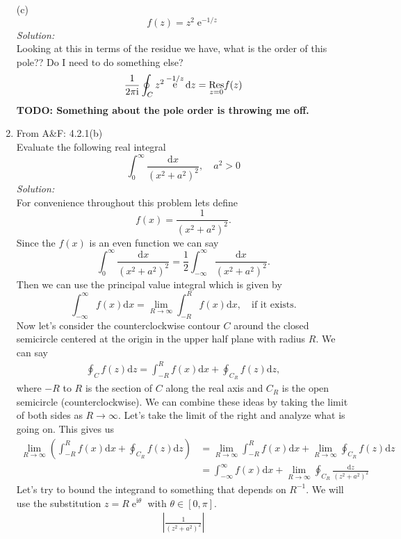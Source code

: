 \documentclass[10pt]{amsart}
\newcommand{\D}{\mathrm{d}}
\newcommand{\I}{\mathrm{i}}
\DeclareMathOperator{\E}{e}
\theoremstyle{nonumberplain}
\begin{document}
\begin{enumerate}[label={\bf {\arabic*}:}]
\noindent
(c)
$$
f(z) = z^2\E^{-1/z}
$$
\textit{Solution:} \\
Looking at this in terms of the residue we have, what is the order of this pole?? Do I need to do something else?
\begin{align*}
\frac 1 {2 \pi \I} \oint_C z^2\E^{-1/z} \D z
	&= \underset{z=0}{\rm Res} f(z) \\
\end{align*}
\textbf{TODO: Something about the pole order is throwing me off.}

\newpage


\item From A\&F: 4.2.1(b)\\
Evaluate the following real integral
$$
\int_0^\infty \frac {\D x}{ (x^2 + a^2)^2 }, \quad a^2 > 0
$$
\textit{Solution:} \\
For convenience throughout this problem lets define
$$f(x) = \frac 1 {(x^2 + a^2)^2}.$$
Since the $f(x)$ is an even function we can say
$$
\int_0^\infty \frac {\D x}{ (x^2 + a^2)^2 } = \frac 1 2 \int_{-\infty}^\infty \frac {\D x}{ (x^2 + a^2)^2 }.
$$
Then we can use the principal value integral which is given by
$$
\int_{-\infty}^{\infty}f(x) \D x = \lim_{R\rightarrow \infty} \int_{-R}^R f(x) \D x, \quad \text{if it exists.}
$$
Now let's consider the counterclockwise contour $C$ around the closed semicircle centered at the origin in the upper half plane with radius $R$.
We can say 
\begin{align}
\oint_C f(z) \D z = \int_{-R}^R f(x) \D x + \oint_{C_R}f(z) \D z,
\label{eq:eq01}
\end{align}
where $-R$ to $R$ is the section of $C$ along the real axis and $C_R$ is the open semicircle (counterclockwise).
We can combine these ideas by taking the limit of both sides as $R\rightarrow \infty$.
Let's take the limit of the right and analyze what is going on.
This gives us
\begin{align*}
\lim_{R\rightarrow \infty} \left(\int_{-R}^R f(x) \D x + \oint_{C_R}f(z) \D z \right)
	&= \lim_{R\rightarrow \infty} \int_{-R}^R f(x) \D x + \lim_{R\rightarrow \infty} \oint_{C_R}f(z) \D z \\
	&= \int_{-\infty}^\infty f(x) \D x + \lim_{R\rightarrow \infty} \oint_{C_R} \frac {\D z}{ (z^2 + a^2)^2 }
\end{align*}
Let's try to bound the integrand to something that depends on $R^{-1}$.
We will use the substitution $z = R\E^{\I\theta}$ with $\theta \in [0, \pi]$.
\begin{align*}
\left| \frac 1 {(z^2 + a^2)^2} \right|

\end{align*}
\end{enumerate}
\end{document}
